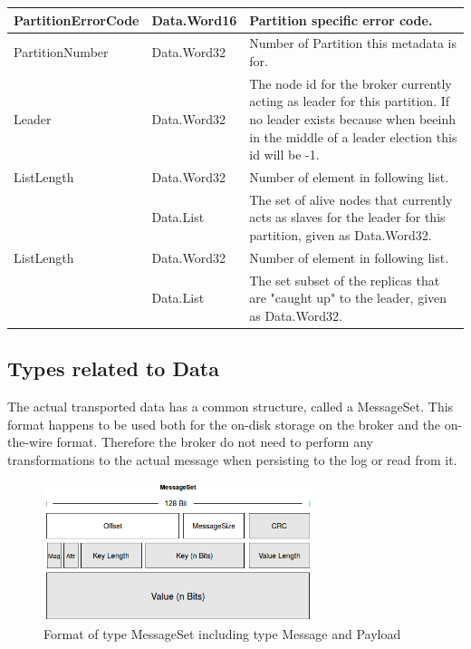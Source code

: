 \begin{table}[H]
\centering
\begin{tabular}{ l  l  p{10cm} }
\hline
PartitionErrorCode  & Data.Word16 & Partition specific error code.                                                          \\ \hline
PartitionNumber     & Data.Word32 & Number of Partition this metadata is for.                                               \\ \hline
Leader              & Data.Word32 & The node id for the broker currently acting as leader for this partition.
                       If no leader exists because when beeinh in the middle of
                       a leader election this id will be -1.                                                                \\ \hline
ListLength        & Data.Word32     & Number of element in following list.                                                  \\ \hline
[Replicas]         & Data.List & The set of alive nodes that currently acts as
                       slaves for the leader for this partition, given as
                       Data.Word32.                                                                                        \\ \hline
ListLength        & Data.Word32     & Number of element in following list.                                                  \\ \hline
[Isr]   & Data.List   & The set subset of the replicas that are "caught up" to
                       the leader, given as Data.Word32.        \\ \hline
\end{tabular}
\end{table}


\subsection{Types related to Data}
\label{impl-protocol-types-data}
The actual transported data has a common structure,
called a MessageSet. This format happens to be used both for the on-disk storage on the
broker and the on-the-wire format. Therefore the broker do not need to perform
any transformations to the actual message when persisting to the log or read
from it. 

\begin{figure}[H]
    \centering
    \includegraphics[width=0.7\textwidth]{images/impl-prot-types-messageSet.png}
    \caption{Format of type MessageSet including type Message and Payload}
    \label{fig:impl-prot-types-messageSet}
\end{figure}

